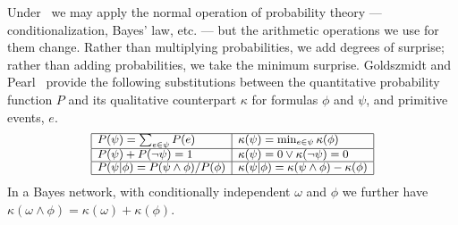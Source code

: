 Under \zplus\ we may apply the normal operation
of probability theory --- conditionalization, Bayes' law, etc. --- but
the arithmetic operations we use for them change.  Rather than multiplying
probabilities, we add degrees of surprise; rather than adding
probabilities, we take the minimum surprise.  Goldszmidt and
Pearl~ provide the following substitutions
between the quantitative probability function $P$ and its qualitative
counterpart $\kappa$ for formulas $\phi$ and $\psi$, and primitive events, $e$.
\begin{displaymath}
  \small
  \begin{array}{|l|l|}
    \hline
  P(\psi) = \sum_{e \in \psi} P(e) & \kappa(\psi) =
  \operatorname{min}_{e \in \psi} \kappa(\phi) \\ \hline
  P(\psi) + P(\neg \psi) = 1 & \kappa(\psi) = 0 \vee \kappa(\neg \psi) = 0
  \\ \hline
  P(\psi | \phi) = P(\psi \wedge \phi) / P(\phi) &
  \kappa(\psi | \phi) = \kappa(\psi \wedge \phi) - \kappa(\phi)
  \\ \hline
\end{array}
\end{displaymath}
\noindent
In a Bayes network, with conditionally independent $\omega$ and
$\phi$ we further have $\kappa(\omega \wedge \phi) = \kappa(\omega) + \kappa(\phi)$.

